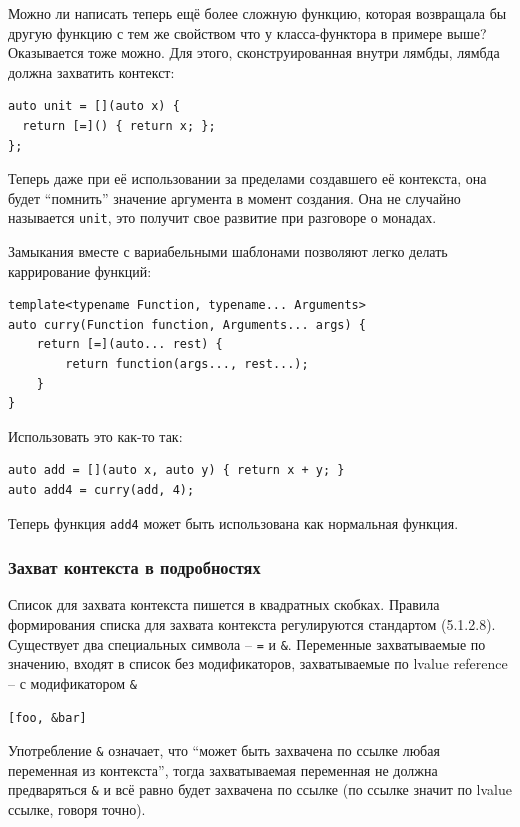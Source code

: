\documentclass[a4paper,12pt,oneside]{article}
\begin{document}
Можно ли написать теперь ещё более сложную функцию, которая возвращала бы другую функцию с тем же свойством что у класса-функтора в примере выше? Оказывается тоже можно. Для этого, сконструированная внутри лямбды, лямбда должна захватить контекст:

\begin{lstlisting}
auto unit = [](auto x) {
  return [=]() { return x; };
};
\end{lstlisting}

Теперь даже при её использовании за пределами создавшего её контекста, она будет ``помнить'' значение аргумента в момент создания. Она не случайно называется \lstinline!unit!, это получит свое развитие при разговоре о монадах.

Замыкания вместе с вариабельными шаблонами позволяют легко делать каррирование функций:

\begin{lstlisting}
template<typename Function, typename... Arguments>
auto curry(Function function, Arguments... args) {
    return [=](auto... rest) {
        return function(args..., rest...);
    }
}
\end{lstlisting}

Использовать это как-то так:

\begin{lstlisting}
auto add = [](auto x, auto y) { return x + y; }
auto add4 = curry(add, 4);
\end{lstlisting}

Теперь функция \lstinline!add4! может быть использована как нормальная функция.

\subsubsection{Захват контекста в подробностях}

Список для захвата контекста пишется в квадратных скобках. Правила формирования списка для захвата контекста регулируются стандартом (5.1.2.8). Существует два специальных символа -- \lstinline!=! и \lstinline!&!. Переменные захватываемые по значению, входят в список без модификаторов, захватываемые по lvalue reference -- с модификатором \lstinline!&!

\begin{lstlisting}
[foo, &bar]
\end{lstlisting}

Употребление \lstinline!&! означает, что ``может быть захвачена по ссылке любая переменная из контекста'', тогда захватываемая переменная не должна предваряться \lstinline!&! и всё равно будет захвачена по ссылке (по ссылке значит по lvalue ссылке, говоря точно).
\end{document}

